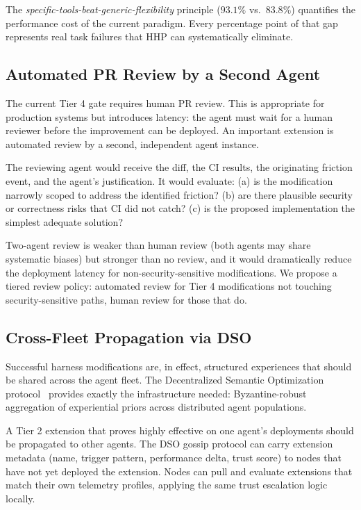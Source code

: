 \documentclass[11pt]{article}
\begin{document}
The \emph{specific-tools-beat-generic-flexibility} principle ($93.1\%$ vs.\
$83.8\%$) quantifies the performance cost of the current paradigm. Every
percentage point of that gap represents real task failures that HHP can
systematically eliminate.

\subsection{Automated PR Review by a Second Agent}
\label{sec:auto-review}

The current Tier 4 gate requires human PR review. This is appropriate for
production systems but introduces latency: the agent must wait for a human
reviewer before the improvement can be deployed. An important extension is
automated review by a second, independent agent instance.

The reviewing agent would receive the diff, the CI results, the originating
friction event, and the agent's justification. It would evaluate: (a) is the
modification narrowly scoped to address the identified friction? (b) are there
plausible security or correctness risks that CI did not catch? (c) is the
proposed implementation the simplest adequate solution?

Two-agent review is weaker than human review (both agents may share systematic
biases) but stronger than no review, and it would dramatically reduce the
deployment latency for non-security-sensitive modifications. We propose a
tiered review policy: automated review for Tier 4 modifications not touching
security-sensitive paths, human review for those that do.

\subsection{Cross-Fleet Propagation via DSO}
\label{sec:dso-propagation}

Successful harness modifications are, in effect, structured experiences that
should be shared across the agent fleet. The Decentralized Semantic Optimization
protocol~\cite{hanzo2026dso} provides exactly the infrastructure needed:
Byzantine-robust aggregation of experiential priors across distributed agent
populations.

A Tier 2 extension that proves highly effective on one agent's deployments
should be propagated to other agents. The DSO gossip protocol can carry
extension metadata (name, trigger pattern, performance delta, trust score) to
nodes that have not yet deployed the extension. Nodes can pull and evaluate
extensions that match their own telemetry profiles, applying the same trust
escalation logic locally.
\end{document}
